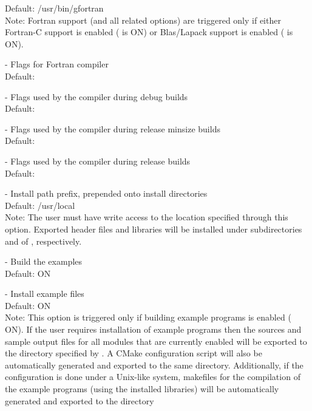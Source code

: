 \begin{description}
  Default: /usr/bin/gfortran
  \\
  Note: Fortran support (and all related options) are triggered only if
  either Fortran-C support is enabled ( is ON) or
  Blas/Lapack support is enabled ( is ON).
\item[\id{CMAKE\_Fortran\_FLAGS}] - 
  Flags for Fortran compiler
  \\
  Default:
\item[\id{CMAKE\_Fortran\_FLAGS\_DEBUG}] - 
  Flags used by the compiler during debug builds
  \\
  Default:
\item[\id{CMAKE\_Fortran\_FLAGS\_MINSIZEREL}] - 
  Flags used by the compiler during release minsize builds
  \\
  Default:
\item[\id{CMAKE\_Fortran\_FLAGS\_RELEASE}] - 
  Flags used by the compiler during release builds
  \\
  Default:
\item[\id{CMAKE\_INSTALL\_PREFIX}] -   
  Install path prefix, prepended onto install directories
  \\
  Default: /usr/local 
  \\
  Note: The user must have write access to the location specified through
  this option. Exported {\sundials} header files and libraries will be 
  installed under subdirectories  and  of 
  , respectively.
\item[\id{EXAMPLES\_ENABLE}] -   
  Build the {\sundials} examples
  \\
  Default: ON
  \\
\item[\id{EXAMPLES\_INSTALL}] - 
  Install example files
  \\
  Default: ON
  \\
  Note: This option is triggered only if building example programs
  is enabled ( ON). If the user requires
  installation of example programs then the sources and sample output files
  for all {\sundials} modules that are currently enabled will be exported to
  the directory specified by . A CMake configuration
  script will also be automatically generated and exported to the same directory.
  Additionally, if the configuration is done under a Unix-like system, makefiles
  for the compilation of the example programs (using the installed {\sundials} libraries)
  will be automatically generated and exported to the directory

\end{description}
